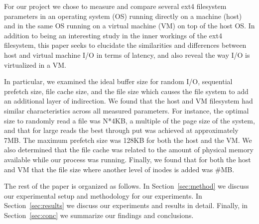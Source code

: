 For our project we chose to measure and compare several ext4 filesystem parameters
in an operating system (OS) running directly on a machine (host) and in the same 
OS running on a virtual machine (VM) on top of the host OS. In addition to being an 
interesting study in the inner workings of the ext4 filesystem, this paper seeks to
elucidate the similarities and differences between host and virtual machine I/O in
terms of latency, and also reveal the way I/O is virtualized in a VM.

In particular, we examined the ideal buffer size for random I/O, sequential 
prefetch size, file cache size, and the file size which causes the file system 
to add an additional layer of indirection. We found that the host and VM filesystem
had similar characteristics across all measured parameters. For instance, the 
optimal size to randomly read a file was N*4KB, a multiple of the page size of the 
system, and that for large reads the best through put was achieved at approximately
7MB. The maximum prefetch size was 128KB for both the host and the VM. We also 
determined that the file cache was related to the amount of physical memory 
available while our process was running. Finally, we found that for both the host
and VM that the file size where another level of inodes is added was \#MB.

The rest of the paper is organized as follows. In Section~\ref{sec:method} we 
discuss our experimental setup and methodology for our experiments. In 
Section~\ref{sec:results} we discuss our experiments and results in detail. 
Finally, in Section~\ref{sec:conc} we summarize our findings and conclusions.

